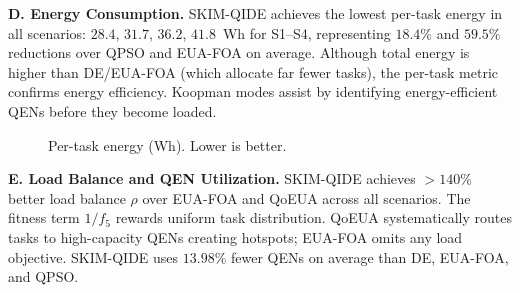 \documentclass[10pt,twocolumn]{article}
\begin{document}
\textbf{D. Energy Consumption.}
SKIM-QIDE achieves the lowest per-task energy in all scenarios: $28.4$, $31.7$, $36.2$, $41.8$~Wh for S1--S4, representing $18.4\%$ and $59.5\%$ reductions over QPSO and EUA-FOA on average. Although total energy is higher than DE/EUA-FOA (which allocate far fewer tasks), the per-task metric confirms energy efficiency. Koopman modes assist by identifying energy-efficient QENs before they become loaded.

\begin{figure}[t]
\centering
{}
\caption{Per-task energy (Wh). Lower is better.}
\label{fig:energy}
\end{figure}

\textbf{E. Load Balance and QEN Utilization.}
SKIM-QIDE achieves $>140\%$ better load balance $\rho$ over EUA-FOA and QoEUA across all scenarios. The fitness term $1/f_5$ rewards uniform task distribution. QoEUA systematically routes tasks to high-capacity QENs creating hotspots; EUA-FOA omits any load objective. SKIM-QIDE uses $13.98\%$ fewer QENs on average than DE, EUA-FOA, and QPSO.
\end{document}
